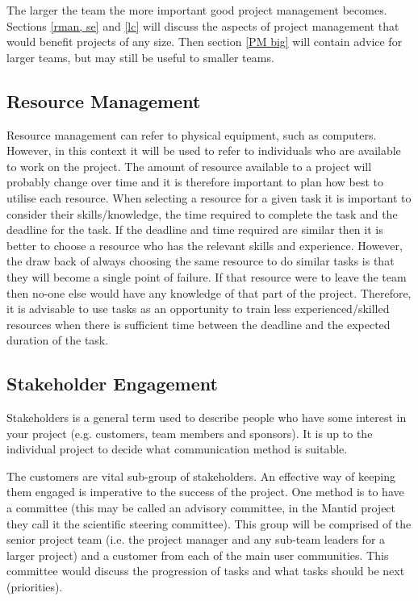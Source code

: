 \documentclass[jnr]{iosart2x}
\begin{document}
\begin{itemzie}
The larger the team the more important good project management becomes.
Sections \ref{rman, se} and \ref{lc} will discuss the aspects of project management that would benefit projects of any size.
Then section \ref{PM big} will contain advice for larger teams, but may still be useful to smaller teams.

\subsection{Resource Management}
\label{rman}

Resource management can refer to physical equipment, such as computers.
However, in this context it will be used to refer to individuals who are available to work on the project.
The amount of resource available to a project will probably change over time and it is therefore important to plan how best to utilise each resource.
When selecting a resource for a given task it is important to consider their skills/knowledge, the time required to complete the task and the deadline for the task.
If the deadline and time required are similar then it is better to choose a resource who has the relevant skills and experience.
However, the draw back of always choosing the same resource to do similar tasks is that they will become a single point of failure.
If that resource were to leave the team then no-one else would have any knowledge of that part of the project.
Therefore, it is advisable to use tasks as an opportunity to train less experienced/skilled resources when there is sufficient time between the deadline and the expected duration of the task.

\subsection{Stakeholder Engagement}
\label{se}

Stakeholders is a general term used to describe people who have some interest in your project (e.g. customers, team members and sponsors).
It is up to the individual project to decide what communication method is suitable.

The customers are vital sub-group of stakeholders.
An effective way of keeping them engaged is imperative to the success of the project.
One method is to have a committee (this may be called an advisory committee, in the Mantid project they call it the scientific steering committee).
This group will be comprised of the senior project team (i.e. the project manager and any sub-team leaders for a larger project) and a customer from each of the main user communities.
This committee would discuss the progression of tasks and what tasks should be next (priorities).


\end{itemzie}
\end{document}
